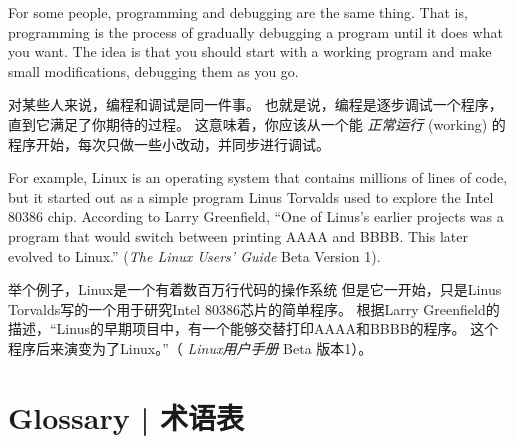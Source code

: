 For some people, programming and debugging are the same thing.  That
is, programming is the process of gradually debugging a program until
it does what you want.  The idea is that you should start with a
working program and make small modifications,
debugging them as you go.

对某些人来说，编程和调试是同一件事。
也就是说，编程是逐步调试一个程序，直到它满足了你期待的过程。
这意味着，你应该从一个能 {\em 正常运行} (working) 的程序开始，每次只做一些小改动，并同步进行调试。

For example, Linux is an operating system that contains millions of
lines of code, but it started out as a simple program Linus Torvalds
used to explore the Intel 80386 chip.  According to Larry Greenfield,
``One of Linus's earlier projects was a program that would switch
between printing AAAA and BBBB.  This later evolved to Linux.''
({\em The Linux Users' Guide} Beta Version 1).

举个例子，Linux是一个有着数百万行代码的操作系统 但是它一开始，只是Linus
Torvalds写的一个用于研究Intel 80386芯片的简单程序。 根据Larry
Greenfield的描述，“Linus的早期项目中，有一个能够交替打印AAAA和BBBB的程序。
这个程序后来演变为了Linux。”（ {\em Linux用户手册} Beta 版本1）。


%
\section{Glossary  |  术语表}


